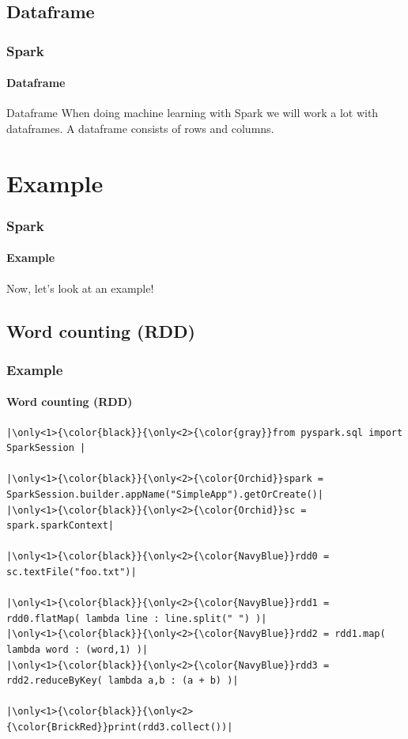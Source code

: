 \documentclass[aspectratio=169,usenames,dvipsnames]{beamer}
\begin{document}
    \subsection{Dataframe}
        \begin{frame}
            \frametitle{Spark}
            \framesubtitle{Dataframe}
            \begin{block}{Dataframe}
                When doing machine learning with Spark we will work a lot with
                dataframes. A dataframe consists of rows and columns.
            \end{block}
        \end{frame}

\section{Example}
        \begin{frame}
            \frametitle{Spark}
            \framesubtitle{Example}
            \begin{center}
                Now, let's look at an example!
            \end{center}
        \end{frame}

\subsection{Word counting (RDD)}
    \begin{frame}[fragile]
        \frametitle{Example}
        \framesubtitle{Word counting (RDD)}
        \begin{center}

        \begin{minipage}{0.8\textwidth}
\begin{lstlisting}[escapechar={|}, title=wordcount.py]
|\only<1>{\color{black}}{\only<2>{\color{gray}}from pyspark.sql import SparkSession |

|\only<1>{\color{black}}{\only<2>{\color{Orchid}}spark = SparkSession.builder.appName("SimpleApp").getOrCreate()|
|\only<1>{\color{black}}{\only<2>{\color{Orchid}}sc = spark.sparkContext|

|\only<1>{\color{black}}{\only<2>{\color{NavyBlue}}rdd0 = sc.textFile("foo.txt")|

|\only<1>{\color{black}}{\only<2>{\color{NavyBlue}}rdd1 = rdd0.flatMap( lambda line : line.split(" ") )|
|\only<1>{\color{black}}{\only<2>{\color{NavyBlue}}rdd2 = rdd1.map( lambda word : (word,1) )|
|\only<1>{\color{black}}{\only<2>{\color{NavyBlue}}rdd3 = rdd2.reduceByKey( lambda a,b : (a + b) )|

|\only<1>{\color{black}}{\only<2>{\color{BrickRed}}print(rdd3.collect())|
\end{lstlisting}
\end{minipage}
\end{center}
    \end{frame}
\end{document}
